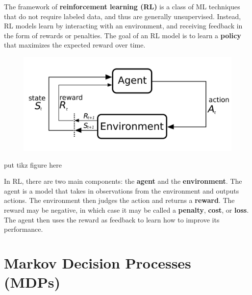 \documentclass[12pt]{report}
\theoremstyle{definition}
\theoremstyle{remark}
\begin{document}
The framework of \textbf{reinforcement learning (RL)} is a class of ML techniques that do not require labeled data, and thus are generally unsupervised. Instead, RL models learn by interacting with an environment, and receiving feedback in the form of rewards or penalties. The goal of an RL model is to learn a \textbf{policy} that maximizes the expected reward over time.

\begin{figure}[h]
    \centering
    \includegraphics[width=0.5\linewidth]{figs/RL_schematic.png}
    \caption{\cite{commons_filemarkov_2023}}
    \label{fig:enter-label}
\end{figure}

put tikz figure here




In RL, there are two main components: the \textbf{agent} and the \textbf{environment}. The agent is a model that takes in observations from the environment and outputs actions.  The environment then judges the action and returns a \textbf{reward}. The reward may be negative, in which case it may be called a \textbf{penalty}, \textbf{cost}, or \textbf{loss}. The agent then uses the reward as feedback to learn how to improve its performance.

\section{Markov Decision Processes (MDPs)}
\end{document}
